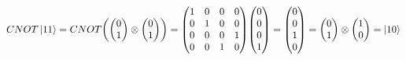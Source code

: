 \documentclass[../../main.tex]{subfiles}
\begin{document}
$
CNOT\ket{11}=CNOT
\mqty(
\mqty(0\\1)
\otimes
\mqty(0\\1)
)
=
\mqty(
1&0&0&0\\
0&1&0&0\\
0&0&0&1\\
0&0&1&0\\
)
\mqty(0\\0\\0\\1)
=
\mqty(0\\0\\1\\0)
=
\mqty(0\\1)\otimes
\mqty(1\\0)=\ket{10}
$
\end{document}
